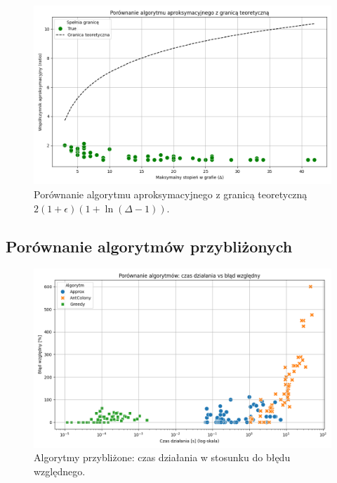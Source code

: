 \begin{figure}[H]
    \centering
    \includegraphics[width=\textwidth]{assets/plots_approx/image.png}
    \caption{Porównanie algorytmu aproksymacyjnego z granicą teoretyczną $2(1+\epsilon)(1 + \ln(\Delta - 1))$.}
    \label{fig:approxPlot}
\end{figure}

\subsection{Porównanie algorytmów przybliżonych}

\begin{figure}[H]
    \centering
    \includegraphics[width=\textwidth]{assets/plots_approx/alorithms.png}
    \caption{Algorytmy przybliżone: czas działania w stosunku do błędu względnego.}
    \label{fig:approxPlot}
\end{figure}

